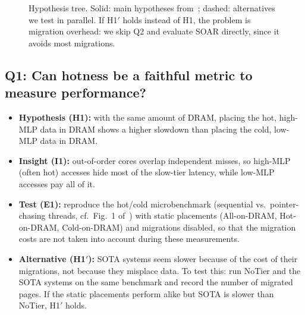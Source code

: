 \documentclass[conference]{IEEEtran}
\begin{document}
\begin{figure}[t]
\centering
{}
\caption{Hypothesis tree. Solid: main hypotheses from~\cite{liu2025tiered};
dashed: alternatives we test in parallel. If H1$'$ holds instead of H1, the
problem is migration overhead: we skip Q2 and evaluate SOAR directly, since it
avoids most migrations.}
\label{fig:tree}
\end{figure}

\subsection{Q1: Can hotness be a faithful metric to measure performance?}
\begin{itemize} 
  \item \textbf{Hypothesis (H1):} with the same amount of DRAM, placing the
        hot, high-MLP data in DRAM shows a higher slowdown than
        placing the cold, low-MLP data in DRAM.
  \item \textbf{Insight (I1):} out-of-order cores overlap independent misses,
        so high-MLP (often hot) accesses hide most of the slow-tier latency,
        while low-MLP accesses pay all of it.
  \item \textbf{Test (E1):} reproduce the hot/cold microbenchmark
        (sequential vs.\ pointer-chasing threads, cf.\
        Fig.~1 of~\cite{liu2025tiered}) with static placements
        (All-on-DRAM, Hot-on-DRAM, Cold-on-DRAM) and migrations disabled, so
        that the migration costs are not taken into account during these measurements.
  \item \textbf{Alternative (H1$'$):} SOTA systems seem slower because of the cost
        of their migrations, not because they misplace data. 
        To test this: run NoTier and the SOTA systems on the same benchmark and
        record the number of migrated pages. If the static placements perform
        alike but SOTA is slower than NoTier, H1$'$ holds.
\end{itemize}
\end{document}
